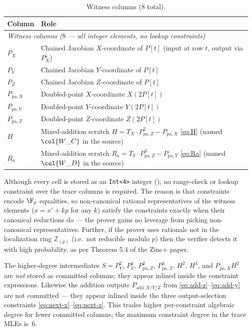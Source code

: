 \begin{table}[h]
\centering\small
\begin{tabular}{ll}
\toprule
\textbf{Column} & \textbf{Role} \\
\midrule
\multicolumn{2}{l}{\textit{Witness columns ($8$ — all integer elements, no lookup constraints)}} \\[1pt]
$P_X$  & Chained Jacobian $X$-coordinate of $P[t]$ \quad (input at row $t$, output via $P_X^{\downarrow}$) \\
$P_Y$  & Chained Jacobian $Y$-coordinate of $P[t]$ \\
$P_Z$  & Chained Jacobian $Z$-coordinate of $P[t]$ \\
$P_{\mathrm{pa},X}$ & Doubled-point $X$-coordinate $X(2 P[t])$ \\
$P_{\mathrm{pa},Y}$ & Doubled-point $Y$-coordinate $Y(2 P[t])$ \\
$P_{\mathrm{pa},Z}$ & Doubled-point $Z$-coordinate $Z(2 P[t])$ \\
$H$    & Mixed-addition scratch $H = T_X \cdot P_{\mathrm{pa},Z}^2 - P_{\mathrm{pa},X}$ \eqref{eq:H} \quad (named $\col{W\_C}$ in the source) \\
$R_a$  & Mixed-addition scratch $R_a = T_Y \cdot P_{\mathrm{pa},Z}^3 - P_{\mathrm{pa},Y}$ \eqref{eq:Ra} \quad (named $\col{W\_D}$ in the source) \\
\bottomrule
\end{tabular}
\caption{Witness columns ($8$ total).}
\label{tab:wit-cols}
\end{table}

\begin{remark}\label{rem:no-range}
Although every cell is stored as an \texttt{Int<4>} integer
(), no range-check or lookup constraint over the
trace columns is required. The reason is that constraints encode
$\F_p$ equalities, so non-canonical rational representatives of the
witness elements ($x = x' + kp$ for any $k$) satisfy
the constraints exactly when their canonical reductions do — the
prover gains no leverage from picking non-canonical representatives. Further, if the prover uses rationals not in the localization ring $\mathbb{Z}_{(p)}$ (i.e.\ not reducible modulo $p$) then the verifier detects it with high probability, as per Theorem 5.4 of the Zinc+ paper.
\end{remark}

\begin{remark}\label{rem:inlined}
The higher-degree intermediates $S = P_Y^2$, $P_Y^4$, $P_{\mathrm{pa},Z}^2$,
$P_{\mathrm{pa},Z}^3$, $H^2$, $H^3$, and $P_{\mathrm{pa},X} H^2$ are
\emph{not} stored as committed columns; they appear inlined inside
the constraint expressions. Likewise the addition outputs
$P_{\mathrm{add}, X/Y/Z}$ from \eqref{eq:add-z}--\eqref{eq:add-y} are
not committed — they appear inlined inside the three
output-selection constraints \eqref{eq:next-x}--\eqref{eq:next-z}.
This trades higher per-constraint algebraic degree for fewer
committed columns; the maximum constraint degree in the trace
MLEs is~$6$.
\end{remark}

